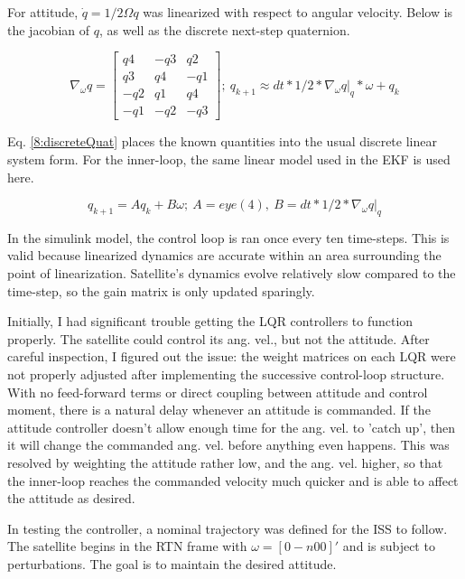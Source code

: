 \documentclass[12pt, letterpaper]{article}
\begin{document}
For attitude, $\dot{q} = 1/2\Omega q$ was linearized with respect to angular velocity. Below is the jacobian of $q$, as well as the discrete next-step quaternion.

\[
\nabla_\omega q =
\begin{bmatrix}
q4 &-q3 &q2 \\
q3 &q4 &-q1 \\
-q2 &q1 &q4 \\
-q1 &-q2 &-q3
\end{bmatrix}
;\ q_{k+1} \approx dt*1/2*\nabla_\omega q|_q*\omega + q_k
\]

Eq. \ref{8:discreteQuat} places the known quantities into the usual discrete linear system form. For the inner-loop, the same linear model used in the EKF is used here.

\begin{equation}
q_{k+1} = A q_k + B \omega;\ A = eye(4),\ B = dt*1/2*\nabla_\omega q|_q
\label{8:discreteQuat}
\end{equation}

In the simulink model, the control loop is ran once every ten time-steps. This is valid because linearized dynamics are accurate within an area surrounding the point of linearization. Satellite's dynamics evolve relatively slow compared to the time-step, so the gain matrix is only updated sparingly.

Initially, I had significant trouble getting the LQR controllers to function properly. The satellite could control its ang. vel., but not the attitude. After careful inspection, I figured out the issue: the weight matrices on each LQR were not properly adjusted after implementing the successive control-loop structure. With no feed-forward terms or direct coupling between attitude and control moment, there is a natural delay whenever an attitude is commanded. If the attitude controller doesn't allow enough time for the ang. vel. to 'catch up', then it will change the commanded ang. vel. before anything even happens. This was resolved by weighting the attitude rather low, and the ang. vel. higher, so that the inner-loop reaches the commanded velocity much quicker and is able to affect the attitude as desired.

In testing the controller, a nominal trajectory was defined for the ISS to follow. The satellite begins in the RTN frame with $\omega=[0 -n0 0]'$ and is subject to perturbations. The goal is to maintain the desired attitude.
\end{document}
